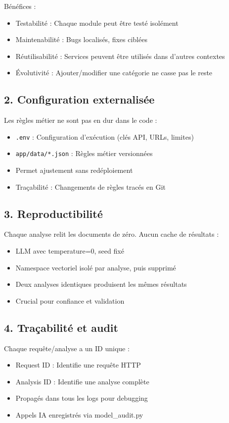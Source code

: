 \documentclass[12pt,a4paper,oneside]{book}
\begin{document}
Bénéfices :
\begin{itemize}
    \item Testabilité : Chaque module peut être testé isolément
    \item Maintenabilité : Bugs localisés, fixes ciblées
    \item Réutilisabilité : Services peuvent être utilisés dans d'autres contextes
    \item Évolutivité : Ajouter/modifier une catégorie ne casse pas le reste
\end{itemize}

\subsection{2. Configuration externalisée}

Les règles métier ne sont pas en dur dans le code :
\begin{itemize}
    \item \texttt{.env} : Configuration d'exécution (clés API, URLs, limites)
    \item \texttt{app/data/*.json} : Règles métier versionnées
    \item Permet ajustement sans redéploiement
    \item Traçabilité : Changements de règles tracés en Git
\end{itemize}

\subsection{3. Reproductibilité}

Chaque analyse relit les documents de zéro. Aucun cache de résultats :
\begin{itemize}
    \item LLM avec temperature=0, seed fixé
    \item Namespace vectoriel isolé par analyse, puis supprimé
    \item Deux analyses identiques produisent les mêmes résultats
    \item Crucial pour confiance et validation
\end{itemize}

\subsection{4. Traçabilité et audit}

Chaque requête/analyse a un ID unique :
\begin{itemize}
    \item Request ID : Identifie une requête HTTP
    \item Analysis ID : Identifie une analyse complète
    \item Propagés dans tous les logs pour debugging
    \item Appels IA enregistrés via model\_audit.py
\end{itemize}
\end{document}
